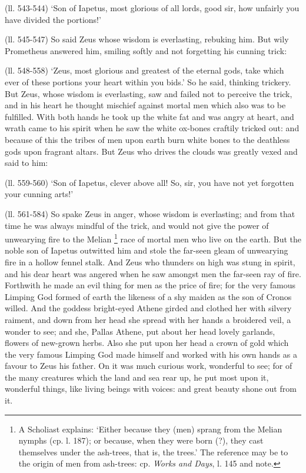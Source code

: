 (ll. 543-544) ‘Son of Iapetus, most glorious of all lords, good sir, how
unfairly you have divided the portions!’

(ll. 545-547) So said Zeus whose wisdom is everlasting, rebuking him. But wily
Prometheus answered him, smiling softly and not forgetting his cunning trick:

(ll. 548-558) ‘Zeus, most glorious and greatest of the eternal gods, take
which ever of these portions your heart within you bids.’ So he said,
thinking trickery. But Zeus, whose wisdom is everlasting, saw and failed not to
perceive the trick, and in his heart he thought mischief against mortal men
which also was to be fulfilled. With both hands he took up the white fat and
was angry at heart, and wrath came to his spirit when he saw the white ox-bones
craftily tricked out: and because of this the tribes of men upon earth burn
white bones to the deathless gods upon fragrant altars. But Zeus who drives the
clouds was greatly vexed and said to him:

(ll. 559-560) ‘Son of Iapetus, clever above all! So, sir, you have not
yet forgotten your cunning arts!’

(ll. 561-584) So spake Zeus in anger, whose wisdom is everlasting; and from
that time he was always mindful of the trick, and would not give the power of
unwearying fire to the Melian \footnote{A Scholiast explains:
‘Either because they (men) sprang from the Melian nymphs (cp. l. 187); or
because, when they were born (?), they cast themselves under the ash-trees,
that is, the trees.’ The reference may be to the origin of men from
ash-trees: cp. \emph{Works and Days}, l. 145 and note.} race of mortal men who live on
the earth. But the noble son of Iapetus outwitted him and stole the far-seen
gleam of unwearying fire in a hollow fennel stalk. And Zeus who thunders on
high was stung in spirit, and his dear heart was angered when he saw amongst
men the far-seen ray of fire. Forthwith he made an evil thing for men as the
price of fire; for the very famous Limping God formed of earth the likeness of
a shy maiden as the son of Cronos willed. And the goddess bright-eyed Athene
girded and clothed her with silvery raiment, and down from her head she spread
with her hands a broidered veil, a wonder to see; and she, Pallas Athene, put
about her head lovely garlands, flowers of new-grown herbs. Also she put upon
her head a crown of gold which the very famous Limping God made himself and
worked with his own hands as a favour to Zeus his father. On it was much
curious work, wonderful to see; for of the many creatures which the land and
sea rear up, he put most upon it, wonderful things, like living beings with
voices: and great beauty shone out from it.

